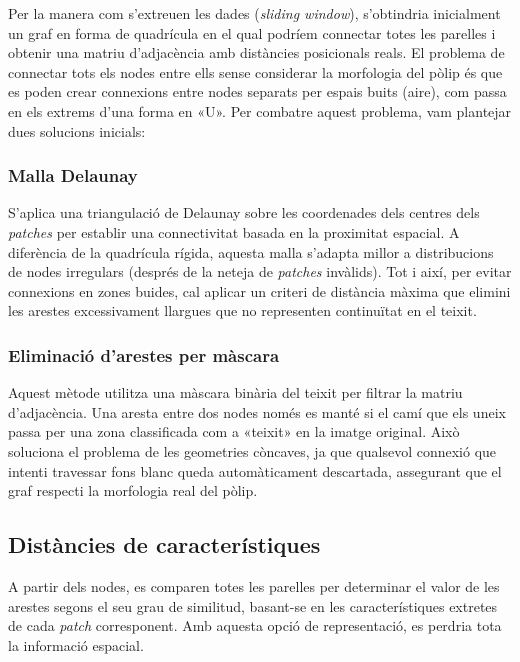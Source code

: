 ﻿\documentclass[10pt,a4paper,twocolumn,twoside]{article}
\begin{document}
Per la manera com s'extreuen les dades (\textit{sliding window}), s'obtindria inicialment un graf en forma de quadrícula en el qual podríem connectar totes les parelles i obtenir una matriu d'adjacència amb distàncies posicionals reals. El problema de connectar tots els nodes entre ells sense considerar la morfologia del pòlip és que es poden crear connexions entre nodes separats per espais buits (aire), com passa en els extrems d'una forma en «U». Per combatre aquest problema, vam plantejar dues solucions inicials:

\subsubsection{Malla Delaunay}

S’aplica una triangulació de Delaunay sobre les coordenades dels centres dels \textit{patches} per establir una connectivitat basada en la proximitat espacial. A diferència de la quadrícula rígida, aquesta malla s'adapta millor a distribucions de nodes irregulars (després de la neteja de \textit{patches} invàlids). Tot i així, per evitar connexions en zones buides, cal aplicar un criteri de distància màxima que elimini les arestes excessivament llargues que no representen continuïtat en el teixit.

\subsubsection{Eliminació d'arestes per màscara}

Aquest mètode utilitza una màscara binària del teixit per filtrar la matriu d'adjacència. Una aresta entre dos nodes només es manté si el camí que els uneix passa per una zona classificada com a «teixit» en la imatge original. Això soluciona el problema de les geometries còncaves, ja que qualsevol connexió que intenti travessar fons blanc queda automàticament descartada, assegurant que el graf respecti la morfologia real del pòlip.

\subsection{Distàncies de característiques}

A partir dels nodes, es comparen totes les parelles per determinar el valor de les arestes segons el seu grau de similitud, basant-se en les característiques extretes de cada \textit{patch} corresponent. Amb aquesta opció de representació, es perdria tota la informació espacial.
\end{document}
